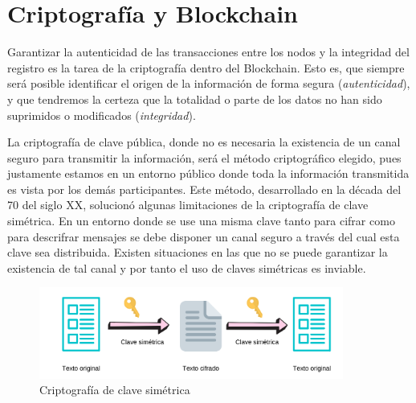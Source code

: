 
\cleardoublepage

\chapter{Criptografía y Blockchain}\label{cap1}

Garantizar la autenticidad de las transacciones entre los nodos y la integridad del registro es la tarea de la criptografía dentro del Blockchain. 
Esto es, que siempre será posible identificar el origen de la información de forma segura (\textit{autenticidad}), y que tendremos la certeza que la totalidad o parte de los datos no han sido suprimidos o modificados (\textit{integridad}).




La criptografía de clave pública, donde no es necesaria la existencia de un canal seguro para transmitir la información, será el método criptográfico elegido, pues justamente estamos en un entorno público donde toda la información transmitida es vista por los demás participantes.
Este método, desarrollado en la década del 70 del siglo XX, solucionó algunas limitaciones de la criptografía de clave simétrica. En un entorno donde se use una misma clave tanto para cifrar como para descrifrar mensajes se debe disponer un canal seguro a través del cual esta clave sea distribuida.\citep{stallings2017cryptography} Existen situaciones en las que no se puede garantizar la existencia de tal canal y por tanto el uso de claves simétricas es inviable. 
\begin{figure}[H]\label{fig:cripto_simetric}

  \begin{center}
  \includegraphics[width=10cm]{figures/simetrica.png}
  \end{center}

  \caption{Criptografía de clave simétrica}

\end{figure} 


